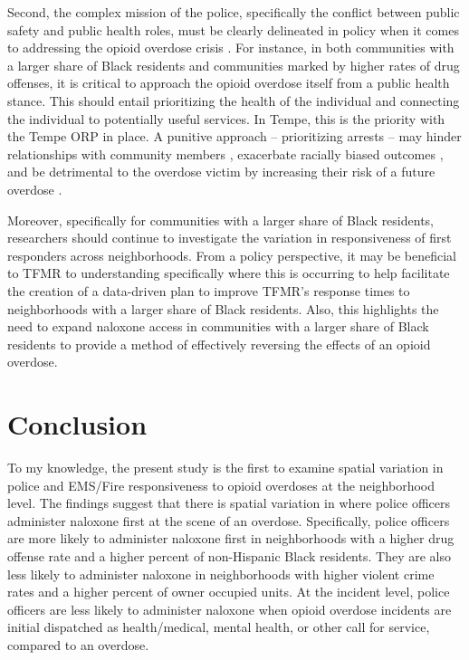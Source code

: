 Second, the complex mission of the police, specifically the conflict between public safety and public health roles, must be clearly delineated in policy when it comes to addressing the opioid overdose crisis \parencite{del_pozo_beyond_2021}. For instance, in both communities with a larger share of Black residents and communities marked by higher rates of drug offenses, it is critical to approach the opioid overdose itself from a public health stance. This should entail prioritizing the health of the individual and connecting the individual to potentially useful services. In Tempe, this is the priority with the Tempe ORP in place. A punitive approach -- prioritizing arrests -- may hinder relationships with community members \parencite{van_der_meulen_thats_2021}, exacerbate racially biased outcomes \parencite{kochel_effect_2011}, and be detrimental to the overdose victim by increasing their risk of a future overdose \parencite{binswanger_clinical_2016, ray_spatiotemporal_2023}.

Moreover, specifically for communities with a larger share of Black residents, researchers should continue to investigate the variation in responsiveness of first responders across neighborhoods. From a policy perspective, it may be beneficial to TFMR to understanding specifically where this is occurring to help facilitate the creation of a data-driven plan to improve TFMR's response times to neighborhoods with a larger share of Black residents. Also, this highlights the need to expand naloxone access in communities with a larger share of Black residents to provide a method of effectively reversing the effects of an opioid overdose. 

\section{\centering Conclusion}

To my knowledge, the present study is the first to examine spatial variation in police and EMS/Fire responsiveness to opioid overdoses at the neighborhood level. The findings suggest that there is spatial variation in where police officers administer naloxone first at the scene of an overdose. Specifically, police officers are more likely to administer naloxone first in neighborhoods with a higher drug offense rate and a higher percent of non-Hispanic Black residents. They are also less likely to administer naloxone in neighborhoods with higher violent crime rates and a higher percent of owner occupied units. At the incident level, police officers are less likely to administer naloxone when opioid overdose incidents are initial dispatched as health/medical, mental health, or other call for service, compared to an overdose. 

